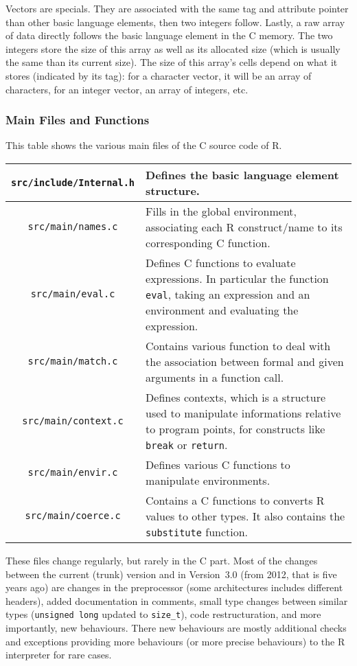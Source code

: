 \documentclass{article}
\newcommand\R{R}
\newcommand\Cn{C}
\begin{document}
Vectors are specials.
They are associated with the same tag and attribute pointer
than other basic language elements,
then two integers follow.
Lastly, a raw array of data directly follows the basic language element in the \Cn{} memory.
The two integers store the size of this array as well as its allocated size
(which is usually the same than its current size).
The size of this array’s cells depend on what it stores
(indicated by its tag):
for a character vector, it will be an array of characters,
for an integer vector, an array of integers, etc.


\subsubsection{Main Files and Functions}
\label{sec:files}

This table shows the various main files of the \Cn{} source code of \R{}.

\begin{tabular}{|c|p{7cm}|}
    \hline
    \texttt{src/include/Internal.h} & Defines the basic language element structure. \\
    \hline
    \texttt{src/main/names.c} & Fills in the global environment, associating each \R{} construct/name to its corresponding \Cn{} function. \\
    \hline
    \texttt{src/main/eval.c} & Defines \Cn{} functions to evaluate expressions. In particular the function \texttt{eval}, taking an expression and an environment and evaluating the expression. \\
    \hline
    \texttt{src/main/match.c} & Contains various function to deal with the association between formal and given arguments in a function call. \\
    \hline
    \texttt{src/main/context.c} & Defines contexts, which is a structure used to manipulate informations relative to program points, for constructs like \texttt{break} or \texttt{return}. \\
    \hline
    \texttt{src/main/envir.c} & Defines various \Cn{} functions to manipulate environments. \\
    \hline
    \texttt{src/main/coerce.c} & Contains a \Cn{} functions to converts \R{} values to other types. It also contains the \texttt{substitute} function. \\
    \hline
\end{tabular}

These files change regularly,
but rarely in the \Cn{} part.
Most of the changes between the current (trunk) version
and in Version~\(3.0\) (from 2012, that is five years ago)
are changes in the preprocessor
(some architectures includes different headers),
added documentation in comments,
small type changes between similar types
(\texttt{unsigned long} updated to \texttt{size_t}),
code restructuration,
and more importantly,
new behaviours.
There new behaviours are mostly additional checks
and exceptions providing more behaviours
(or more precise behaviours) to the \R{} interpreter
for rare cases.
\end{document}
